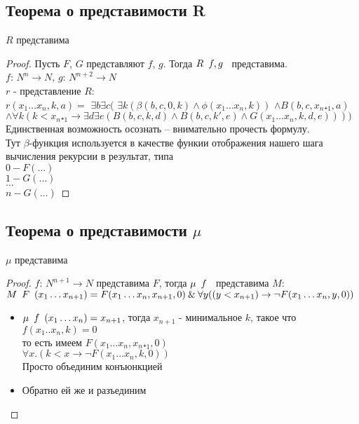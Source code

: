 \subsection{Теорема о представимости R}
\label{sec-11-6}
\begin{theorem}
$R$ представима
\end{theorem}
\begin{proof}
Пусть $F$, $G$ представляют $f$, $g$. Тогда $R\template{f, g}$ представима.\\
$f$: $N^n \to N$, $g$: $N^{n+2} \to N$\\
$r$ - представление $R$:\\
$r(x_1 \dots x_n, k, a) =$
   $\exists b\exists c($
        $\exists k(\beta(b, c, 0, k) \land \phi(x_1\dots x_n, k))$
        $\land B(b, c, x_n₊_1, a)$\\
        $\land \forall k(k<x_n₊_1 \to \exists d\exists e(B(b,c,k,d) \land B(b,c,k',e) \land G(x_1\dots x_n,k,d,e))))$\\
Единственная возможность осознать -- внимательно прочесть формулу.\\
Тут $\beta$-функция используется в качестве функии отображения нашего шага вычисления рекурсии в результат, типа\\
$0 - F(\dots )$\\
$1 - G(\dots )$\\
$\dots $\\
$n - G(\dots )$
\end{proof}
\subsection{Теорема о представимости \texorpdfstring{$\mu$}{мю}}
\label{sec-11-7}
\begin{theorem}
$\mu$ представима
\end{theorem}
\begin{proof}
$f$: $N^{n+1} \to N $ представима $F$, тогда $\mu \template{f}$ представима $M$:\\
$M\template{F}(x_1 \dots x_{n+1}) = F(x_1 \dots x_n, x_{n+1}, 0) \land \forall y((y < x_{n+1}) \to \lnot F(x_1 \dots x_n, y, 0))$
\begin{itemize}
\item $\mu \template{f}(x_1 \dots x_n) = x_{n+1}$, тогда $x_{n+1}$ - минимальное $k$, такое что $f(x_1..x_n,k) = 0$\\
то есть имеем $F(x_1\dots x_n, x_n₊_1, 0)$\\
$\forall x.(k < x \to \lnot F(x_1 \dots x_n, k, 0))$\\
Просто объединим конъюнкцией
\item Обратно ей же и разъединим
\end{itemize}
\end{proof}
